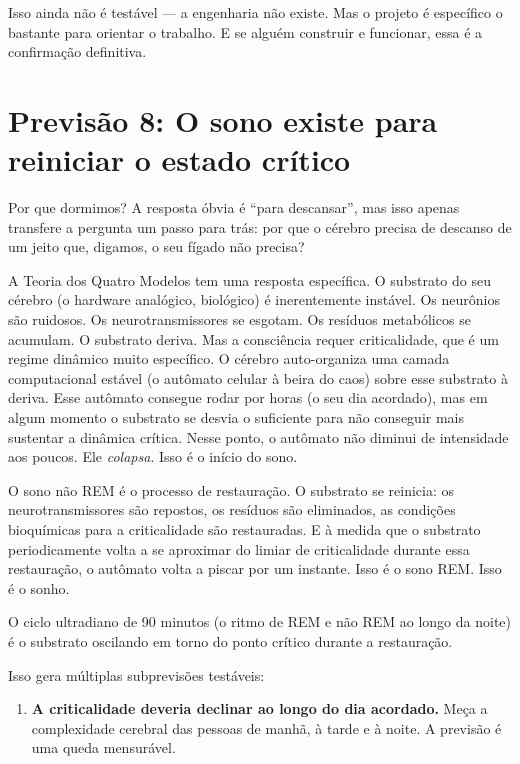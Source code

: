 \documentclass[11pt, twoside, openright]{book}
\begin{document}
Isso ainda não é testável --- a engenharia não existe. Mas o projeto é específico o bastante para orientar o trabalho. E se alguém construir e funcionar, essa é a confirmação definitiva.

\section*{Previsão 8: O sono existe para reiniciar o estado crítico}

Por que dormimos? A resposta óbvia é ``para descansar'', mas isso apenas transfere a pergunta um passo para trás: por que o cérebro precisa de descanso de um jeito que, digamos, o seu fígado não precisa?

A Teoria dos Quatro Modelos tem uma resposta específica. O substrato do seu cérebro (o hardware analógico, biológico) é inerentemente instável. Os neurônios são ruidosos. Os neurotransmissores se esgotam. Os resíduos metabólicos se acumulam. O substrato deriva. Mas a consciência requer criticalidade, que é um regime dinâmico muito específico. O cérebro auto-organiza uma camada computacional estável (o autômato celular à beira do caos) sobre esse substrato à deriva. Esse autômato consegue rodar por horas (o seu dia acordado), mas em algum momento o substrato se desvia o suficiente para não conseguir mais sustentar a dinâmica crítica. Nesse ponto, o autômato não diminui de intensidade aos poucos. Ele \textit{colapsa}. Isso é o início do sono.

O sono não REM é o processo de restauração. O substrato se reinicia: os neurotransmissores são repostos, os resíduos são eliminados, as condições bioquímicas para a criticalidade são restauradas. E à medida que o substrato periodicamente volta a se aproximar do limiar de criticalidade durante essa restauração, o autômato volta a piscar por um instante. Isso é o sono REM. Isso é o sonho.

O ciclo ultradiano de 90 minutos (o ritmo de REM e não REM ao longo da noite) é o substrato oscilando em torno do ponto crítico durante a restauração.

Isso gera múltiplas subprevisões testáveis:

\begin{enumerate}
  \item \textbf{A criticalidade deveria declinar ao longo do dia acordado.} Meça a complexidade cerebral das pessoas de manhã, à tarde e à noite. A previsão é uma queda mensurável.
\end{enumerate}
\end{document}
